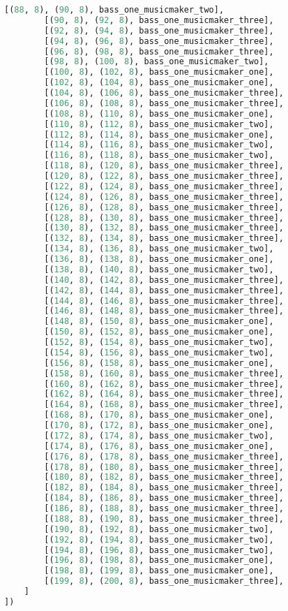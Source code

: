 \begin{lstlisting}[language=Python, caption=Invocation Source Code]
        [(88, 8), (90, 8), bass_one_musicmaker_two],
        [(90, 8), (92, 8), bass_one_musicmaker_three],
        [(92, 8), (94, 8), bass_one_musicmaker_three],
        [(94, 8), (96, 8), bass_one_musicmaker_three],
        [(96, 8), (98, 8), bass_one_musicmaker_three],
        [(98, 8), (100, 8), bass_one_musicmaker_two],
        [(100, 8), (102, 8), bass_one_musicmaker_one],
        [(102, 8), (104, 8), bass_one_musicmaker_one],
        [(104, 8), (106, 8), bass_one_musicmaker_three],
        [(106, 8), (108, 8), bass_one_musicmaker_three],
        [(108, 8), (110, 8), bass_one_musicmaker_one],
        [(110, 8), (112, 8), bass_one_musicmaker_two],
        [(112, 8), (114, 8), bass_one_musicmaker_one],
        [(114, 8), (116, 8), bass_one_musicmaker_two],
        [(116, 8), (118, 8), bass_one_musicmaker_two],
        [(118, 8), (120, 8), bass_one_musicmaker_three],
        [(120, 8), (122, 8), bass_one_musicmaker_three],
        [(122, 8), (124, 8), bass_one_musicmaker_three],
        [(124, 8), (126, 8), bass_one_musicmaker_three],
        [(126, 8), (128, 8), bass_one_musicmaker_three],
        [(128, 8), (130, 8), bass_one_musicmaker_three],
        [(130, 8), (132, 8), bass_one_musicmaker_three],
        [(132, 8), (134, 8), bass_one_musicmaker_three],
        [(134, 8), (136, 8), bass_one_musicmaker_two],
        [(136, 8), (138, 8), bass_one_musicmaker_one],
        [(138, 8), (140, 8), bass_one_musicmaker_two],
        [(140, 8), (142, 8), bass_one_musicmaker_three],
        [(142, 8), (144, 8), bass_one_musicmaker_three],
        [(144, 8), (146, 8), bass_one_musicmaker_three],
        [(146, 8), (148, 8), bass_one_musicmaker_three],
        [(148, 8), (150, 8), bass_one_musicmaker_one],
        [(150, 8), (152, 8), bass_one_musicmaker_one],
        [(152, 8), (154, 8), bass_one_musicmaker_two],
        [(154, 8), (156, 8), bass_one_musicmaker_two],
        [(156, 8), (158, 8), bass_one_musicmaker_one],
        [(158, 8), (160, 8), bass_one_musicmaker_three],
        [(160, 8), (162, 8), bass_one_musicmaker_three],
        [(162, 8), (164, 8), bass_one_musicmaker_three],
        [(164, 8), (168, 8), bass_one_musicmaker_three],
        [(168, 8), (170, 8), bass_one_musicmaker_one],
        [(170, 8), (172, 8), bass_one_musicmaker_one],
        [(172, 8), (174, 8), bass_one_musicmaker_two],
        [(174, 8), (176, 8), bass_one_musicmaker_one],
        [(176, 8), (178, 8), bass_one_musicmaker_three],
        [(178, 8), (180, 8), bass_one_musicmaker_three],
        [(180, 8), (182, 8), bass_one_musicmaker_three],
        [(182, 8), (184, 8), bass_one_musicmaker_three],
        [(184, 8), (186, 8), bass_one_musicmaker_three],
        [(186, 8), (188, 8), bass_one_musicmaker_three],
        [(188, 8), (190, 8), bass_one_musicmaker_three],
        [(190, 8), (192, 8), bass_one_musicmaker_two],
        [(192, 8), (194, 8), bass_one_musicmaker_two],
        [(194, 8), (196, 8), bass_one_musicmaker_two],
        [(196, 8), (198, 8), bass_one_musicmaker_one],
        [(198, 8), (199, 8), bass_one_musicmaker_one],
        [(199, 8), (200, 8), bass_one_musicmaker_three],
    ]
])


\end{lstlisting}
